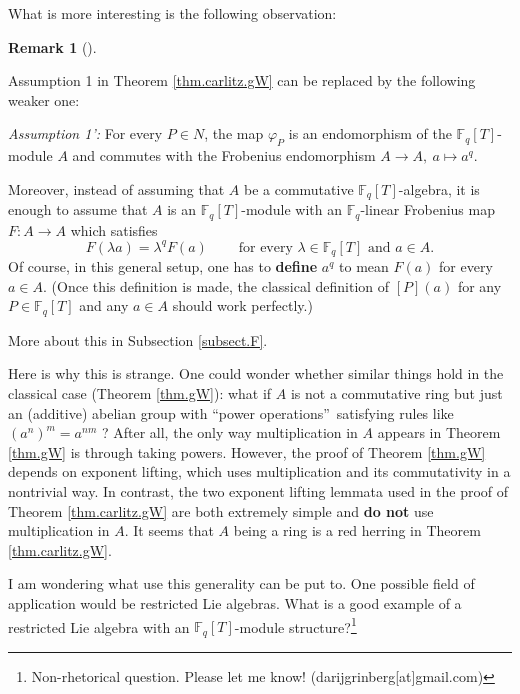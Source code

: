 \documentclass[numbers=enddot,12pt,final,onecolumn,notitlepage]{scrartcl}%
\theoremstyle{definition}
\newtheorem{remk}[theo]{Remark}
\newenvironment{remark}[1][]
{\begin{remk}[#1]\begin{leftbar}}
{\end{leftbar}\end{remk}}
\begin{document}
What is more interesting is the following observation:

\begin{remark}
\label{rmk.carlitz.gW.1'}Assumption 1 in Theorem \ref{thm.carlitz.gW} can be
replaced by the following weaker one:

\textit{Assumption 1':} For every $P\in N$, the map $\varphi_{P}$ is an
endomorphism of the $\mathbb{F}_{q}\left[  T\right]  $-module $A$ and commutes
with the Frobenius endomorphism $A\rightarrow A,\ a\mapsto a^{q}$.

Moreover, instead of assuming that $A$ be a commutative $\mathbb{F}_{q}\left[
T\right]  $-algebra, it is enough to assume that $A$ is an $\mathbb{F}%
_{q}\left[  T\right]  $-module with an $\mathbb{F}_{q}$-linear Frobenius map
$F:A\rightarrow A$ which satisfies%
\begin{equation}
F\left(  \lambda a\right)  =\lambda^{q}F\left(  a\right)
\ \ \ \ \ \ \ \ \ \ \text{for every }\lambda\in\mathbb{F}_{q}\left[  T\right]
\text{ and }a\in A. \label{eq.frobcond}%
\end{equation}
Of course, in this general setup, one has to \textbf{define} $a^{q}$ to mean
$F\left(  a\right)  $ for every $a\in A$. (Once this definition is made, the
classical definition of $\left[  P\right]  \left(  a\right)  $ for any
$P\in\mathbb{F}_{q}\left[  T\right]  $ and any $a\in A$ should work perfectly.)

More about this in Subsection \ref{subsect.F}.
\end{remark}

Here is why this is strange. One could wonder whether similar things hold in
the classical case (Theorem \ref{thm.gW}): what if $A$ is not a commutative
ring but just an (additive) abelian group with \textquotedblleft power
operations\textquotedblright\ satisfying rules like $\left(  a^{n}\right)
^{m}=a^{nm}$ ? After all, the only way multiplication in $A$ appears in
Theorem \ref{thm.gW} is through taking powers. However, the proof of Theorem
\ref{thm.gW} depends on exponent lifting, which uses multiplication and its
commutativity in a nontrivial way. In contrast, the two exponent lifting
lemmata used in the proof of Theorem \ref{thm.carlitz.gW} are both extremely
simple and \textbf{do not} use multiplication in $A$. It seems that $A$ being
a ring is a red herring in Theorem \ref{thm.carlitz.gW}.

I am wondering what use this generality can be put to. One possible field of
application would be restricted Lie algebras. What is a good example of a
restricted Lie algebra with an $\mathbb{F}_{q}\left[  T\right]  $-module
structure?\footnote{Non-rhetorical question. Please let me know!
(darijgrinberg[at]gmail.com)}
\end{document}
